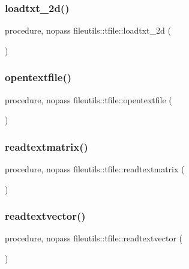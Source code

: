 \subsubsection{\texorpdfstring{loadtxt\+\_\+2d()}{loadtxt\_2d()}}
{\footnotesize\ttfamily procedure, nopass fileutils\+::tfile\+::loadtxt\+\_\+2d (\begin{DoxyParamCaption}{ }\end{DoxyParamCaption})\hspace{0.3cm}{\ttfamily [private]}}

\mbox{\label{structfileutils_1_1tfile_a4e99397c09f386101f39ca86bae2a275}} 
\subsubsection{\texorpdfstring{opentextfile()}{opentextfile()}}
{\footnotesize\ttfamily procedure, nopass fileutils\+::tfile\+::opentextfile (\begin{DoxyParamCaption}{ }\end{DoxyParamCaption})\hspace{0.3cm}{\ttfamily [private]}}

\mbox{\label{structfileutils_1_1tfile_a90ddfc45e38b5df0c5afc36b94879c4b}} 
\subsubsection{\texorpdfstring{readtextmatrix()}{readtextmatrix()}}
{\footnotesize\ttfamily procedure, nopass fileutils\+::tfile\+::readtextmatrix (\begin{DoxyParamCaption}{ }\end{DoxyParamCaption})\hspace{0.3cm}{\ttfamily [private]}}

\mbox{\label{structfileutils_1_1tfile_a77d349f6e25307d4c96ed4baf7416465}} 
\subsubsection{\texorpdfstring{readtextvector()}{readtextvector()}}
{\footnotesize\ttfamily procedure, nopass fileutils\+::tfile\+::readtextvector (\begin{DoxyParamCaption}{ }\end{DoxyParamCaption})\hspace{0.3cm}{\ttfamily [private]}}

